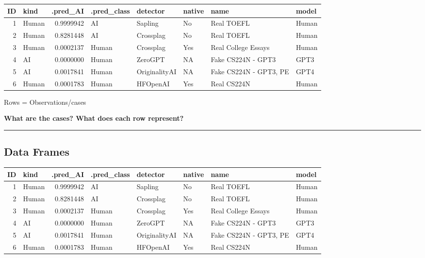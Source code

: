 \documentclass[
  letterpaper,
  DIV=11,
  numbers=noendperiod]{scrartcl}
\begin{document}
\begin{table}
\centering\begingroup\fontsize{32}{34}\selectfont

\begin{tabular}{r|l|r|l|l|l|l|l}
\hline
ID & kind & .pred\_AI & .pred\_class & detector & native & name & model\\
\hline
1 & Human & 0.9999942 & AI & Sapling & No & Real TOEFL & Human\\
\hline
2 & Human & 0.8281448 & AI & Crossplag & No & Real TOEFL & Human\\
\hline
3 & Human & 0.0002137 & Human & Crossplag & Yes & Real College Essays & Human\\
\hline
4 & AI & 0.0000000 & Human & ZeroGPT & NA & Fake CS224N - GPT3 & GPT3\\
\hline
5 & AI & 0.0017841 & Human & OriginalityAI & NA & Fake CS224N - GPT3, PE & GPT4\\
\hline
6 & Human & 0.0001783 & Human & HFOpenAI & Yes & Real CS224N & Human\\
\hline
\end{tabular}
\endgroup{}
\end{table}

Rows = Observations/cases

\textbf{What are the cases? What does each row represent?}

\begin{center}\rule{0.5\linewidth}{0.5pt}\end{center}

\hypertarget{data-frames-2}{%
\subsection{Data Frames}\label{data-frames-2}}

\begin{table}
\centering\begingroup\fontsize{32}{34}\selectfont

\begin{tabular}{r|l|r|l|l|l|l|l}
\hline
ID & kind & .pred\_AI & .pred\_class & detector & native & name & model\\
\hline
1 & Human & 0.9999942 & AI & Sapling & No & Real TOEFL & Human\\
\hline
2 & Human & 0.8281448 & AI & Crossplag & No & Real TOEFL & Human\\
\hline
3 & Human & 0.0002137 & Human & Crossplag & Yes & Real College Essays & Human\\
\hline
4 & AI & 0.0000000 & Human & ZeroGPT & NA & Fake CS224N - GPT3 & GPT3\\
\hline
5 & AI & 0.0017841 & Human & OriginalityAI & NA & Fake CS224N - GPT3, PE & GPT4\\
\hline
6 & Human & 0.0001783 & Human & HFOpenAI & Yes & Real CS224N & Human\\
\hline
\end{tabular}
\endgroup{}
\end{table}
\end{document}
